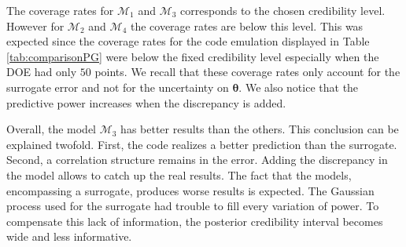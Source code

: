 \documentclass[soumission]{jsfds}
\begin{document}
The coverage rates for $\mathcal{M}_1$ and $\mathcal{M}_3$ corresponds to the chosen credibility level.
However for $\mathcal{M}_2$ and $\mathcal{M}_4$ 
the coverage rates are below this level.
This was expected since the coverage rates for the code emulation displayed in Table \ref{tab:comparisonPG} were below the fixed credibility level
especially when the DOE had only $50$ points. We recall that these coverage rates only account for the surrogate error and not for the uncertainty
on $\boldsymbol{\theta}$.
We also notice that the predictive power increases when the discrepancy is added. \newline



Overall, the model $\mathcal{M}_3$ has better results than the others. 
This conclusion can be explained twofold. First, the code realizes a better prediction than the surrogate.
Second, a correlation structure remains in the error. Adding the discrepancy in the model allows to catch up the real results.
The fact that the models, encompassing a surrogate, produces worse results is expected. The Gaussian process used for the surrogate had trouble to fill every variation of power. To compensate this lack of information, the posterior credibility interval becomes wide and less informative.\newline


\end{document}
